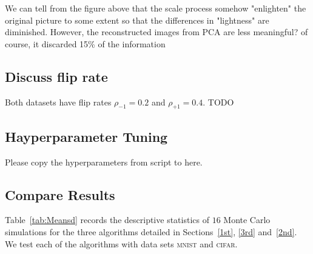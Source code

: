 \documentclass[12pt]{article} %
\newcommand{\rhoo}{\rho_{+1}}
\newcommand{\rhoz}{\rho_{-1}}
\begin{document}
We can tell from the figure above that the scale process somehow "enlighten" the original picture to some extent so that the differences in "lightness" are diminished.
{\color{red} However, the reconstructed images from PCA are less meaningful? of course, it discarded 15\% of the information}


\subsection{Discuss flip rate}

Both datasets have flip rates $\rhoz=0.2$ and $\rhoo=0.4$.
{\color{red} TODO }

\subsection{Hayperparameter Tuning}
Please copy the hyperparameters from script to here.

\subsection{Compare Results}

Table~\ref{tab:Meansd} records the descriptive statistics of $16$ Monte Carlo simulations for the three algorithms detailed in Sections~\ref{1st}, \ref{3rd} and~\ref{2nd}.  We test each of the algorithms with data sets \textsc{mnist} and \textsc{cifar}.
\end{document}
